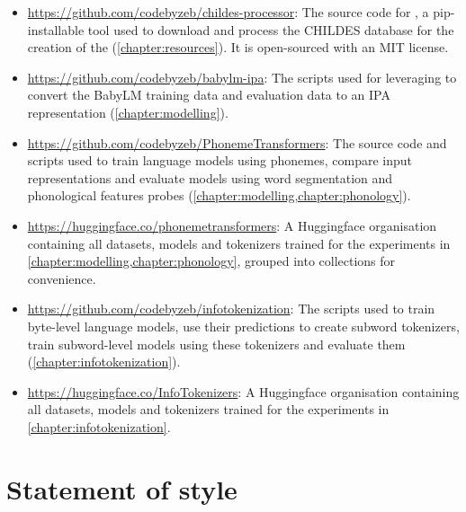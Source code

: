 \begin{itemize}
    \item \href{https://github.com/codebyzeb/childes-processor}{https://github.com/codebyzeb/childes-processor}: The source code for \childesprocessor, a pip-installable tool used to download and process the CHILDES database for the creation of the \ipachildes (\cref{chapter:resources}). It is open-sourced with an MIT license.
    \item \href{https://github.com/codebyzeb/babylm-ipa}{https://github.com/codebyzeb/babylm-ipa}: The scripts used for leveraging \gpp to convert the BabyLM training data and evaluation data to an IPA representation (\cref{chapter:modelling}).
    \item \href{https://github.com/codebyzeb/PhonemeTransformers}{https://github.com/codebyzeb/PhonemeTransformers}: The source code and scripts used to train language models using phonemes, compare input representations and evaluate models using word segmentation and phonological features probes (\cref{chapter:modelling,chapter:phonology}). 
    \item \href{https://huggingface.co/phonemetransformers}{https://huggingface.co/phonemetransformers}: A Huggingface organisation containing all datasets, models and tokenizers trained for the experiments in \cref{chapter:modelling,chapter:phonology}, grouped into collections for convenience.
    \item \href{https://github.com/codebyzeb/infotokenization}{https://github.com/codebyzeb/infotokenization}: The scripts used to train byte-level language models, use their predictions to create subword tokenizers, train subword-level models using these tokenizers and evaluate them (\cref{chapter:infotokenization}).
    \item \href{https://huggingface.co/InfoTokenizers}{https://huggingface.co/InfoTokenizers}: A Huggingface organisation containing all datasets, models and tokenizers trained for the experiments in \cref{chapter:infotokenization}.
\end{itemize}

\section{Statement of style}

